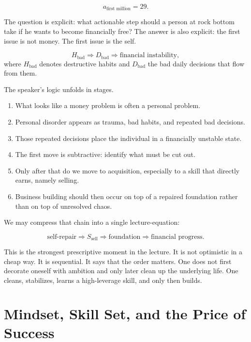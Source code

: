 \begin{equation}
a_{\text{first million}} = 29.
\end{equation}

The question is explicit: what actionable step should a person at rock bottom take if he wants to become financially free? The answer is also explicit: the first issue is not money. The first issue is the self.

\begin{equation}
H_{\text{bad}} \Rightarrow D_{\text{bad}} \Rightarrow \text{financial instability},
\end{equation}
where \(H_{\text{bad}}\) denotes destructive habits and \(D_{\text{bad}}\) the bad daily decisions that flow from them.

The speaker's logic unfolds in stages.

\begin{enumerate}
\item What looks like a money problem is often a personal problem.
\item Personal disorder appears as trauma, bad habits, and repeated bad decisions.
\item Those repeated decisions place the individual in a financially unstable state.
\item The first move is subtractive: identify what must be cut out.
\item Only after that do we move to acquisition, especially to a skill that directly earns, namely selling.
\item Business building should then occur on top of a repaired foundation rather than on top of unresolved chaos.
\end{enumerate}

We may compress that chain into a single lecture-equation:

\begin{equation}
\text{self-repair} \Rightarrow S_{\text{sell}} \Rightarrow \text{foundation} \Rightarrow \text{financial progress}.
\end{equation}

This is the strongest prescriptive moment in the lecture. It is not optimistic in a cheap way. It is sequential. It says that the order matters. One does not first decorate oneself with ambition and only later clean up the underlying life. One cleans, stabilizes, learns a high-leverage skill, and only then builds.

\section{Mindset, Skill Set, and the Price of Success}


